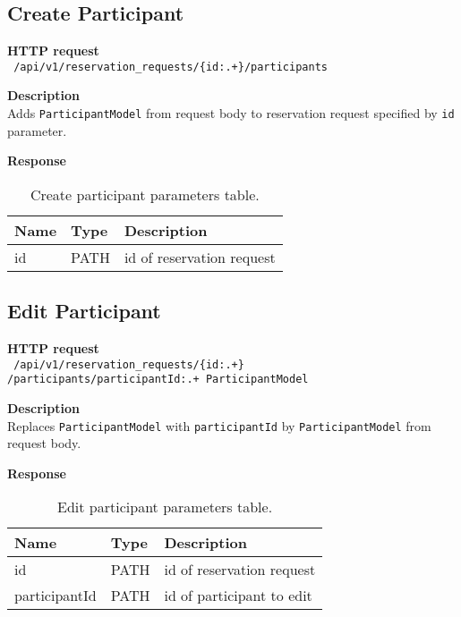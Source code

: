 \subsection{Create Participant}
\begin{description}
    \item \textbf{HTTP request}\\
        \texttt{\text{[POST]} /api/v1/reservation\_requests/\{id:.+\}/participants}
    \item \textbf{Description}\\
        Adds \texttt{ParticipantModel} from request body to reservation request specified by \texttt{id} parameter.
    \item \textbf{Response}\\
        \texttt{\text{[200 OK]}}
\end{description}
\begin{table}[ht!]
    \begin{tabularx}{\textwidth}{llX}
        \toprule
        Name & Type & Description \\
        \midrule
        id & PATH & id of reservation request \\
        \bottomrule
        \end{tabularx}
    \caption{Create participant parameters table.}
\end{table}

\subsection{Edit Participant}
\begin{description}
    \item \textbf{HTTP request}\\
        \texttt{\text{[PUT]} /api/v1/reservation\_requests/\{id:.+\}\\
        /participants/{participantId:.+} ParticipantModel}
    \item \textbf{Description}\\
        Replaces \texttt{ParticipantModel} with \texttt{participantId} by \texttt{ParticipantModel} from request body.
    \item \textbf{Response}\\
        \texttt{\text{[200 OK]}}
\end{description}
\begin{table}[ht!]
    \begin{tabularx}{\textwidth}{llX}
        \toprule
        Name & Type & Description \\
        \midrule
        id & PATH & id of reservation request \\
        participantId & PATH & id of participant to edit \\
        \bottomrule
        \end{tabularx}
    \caption{Edit participant parameters table.}
\end{table}


